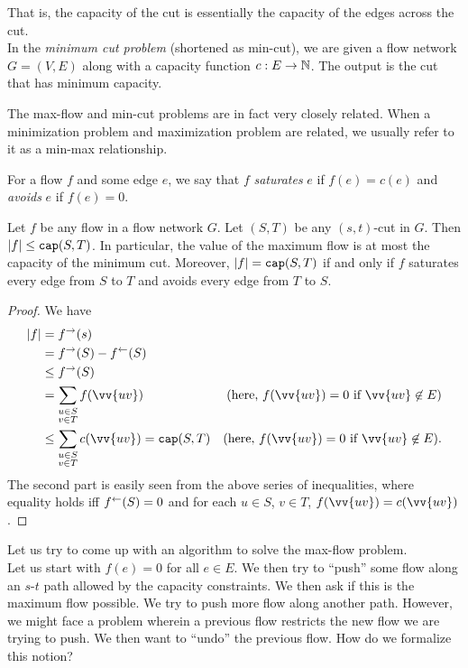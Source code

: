 	That is, the capacity of the cut is essentially the capacity of the edges across the cut.\\
	In the \textit{minimum cut problem} (shortened as min-cut), we are given a flow network $G=(V,E)$ along with a capacity function $c:E\to\mathbb{N}$. The output is the cut that has minimum capacity.

	The max-flow and min-cut problems are in fact very closely related. When a minimization problem and maximization problem are related, we usually refer to it as a min-max relationship.

	For a flow $f$ and some edge $e$, we say that $f$ \textit{saturates} $e$ if $f(e)=c(e)$ and \textit{avoids} $e$ if $f(e)=0$.

	\begin{lemma}
		\label{ff-algo lemma 1}
		Let $f$ be any flow in a flow network $G$. Let $(S,T)$ be any $(s,t)$-cut in $G$. Then $|f|\leq\texttt{cap}(S,T)$. In particular, the value of the maximum flow is at most the capacity of the minimum cut. Moreover, $|f|=\texttt{cap}(S,T)$ if and only if $f$ saturates every edge from $S$ to $T$ and avoids every edge from $T$ to $S$.
	\end{lemma}
	\begin{proof}
		We have
		\begin{align*}
			|f| &= f^\to(s) \\
				&= f^\to(S) - f^\ot(S) \\
				&\leq f^\to(S) \\
				&= \sum_{\substack{u\in S \\ v\in T}} f(\vv{uv}) & (\text{here, }f(\vv{uv})=0\text{ if }\vv{uv}\not\in E) \\
				&\leq \sum_{\substack{u\in S \\ v\in T}} c(\vv{uv})  = \capp(S,T) & (\text{here, }f(\vv{uv})=0\text{ if }\vv{uv}\not\in E). \\
		\end{align*}
		The second part is easily seen from the above series of inequalities, where equality holds iff $f^\leftarrow(S)=0$ and for each $u\in S$, $v\in T$, $f(\vv{uv})=c(\vv{uv})$.
	\end{proof}

	Let us try to come up with an algorithm to solve the max-flow problem.\\
	Let us start with $f(e)=0$ for all $e\in E$. We then try to ``push'' some flow along an $s$-$t$ path allowed by the capacity constraints. We then ask if this is the maximum flow possible. We try to push more flow along another path. However, we might face a problem wherein a previous flow restricts the new flow we are trying to push. We then want to ``undo'' the previous flow. How do we formalize this notion?

